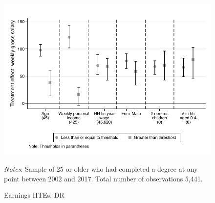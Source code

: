 \documentclass[12pt, a4paper]{article}
\begin{document}
\begin{figure}[htbp]
\centering
\caption{Earnings HTEs: DR}
\vspace{0.5cm}
  \label{fig:htedr}
    \includegraphics{_figures/hte_earnings_GL_100_DR.pdf}
\parbox{1\textwidth}{\footnotesize{\textit{Notes}: Sample of 25 or older who had completed a degree at any point between 2002 and 2017. Total number of observations 5,441.}}
\end{figure}

\end{document}

